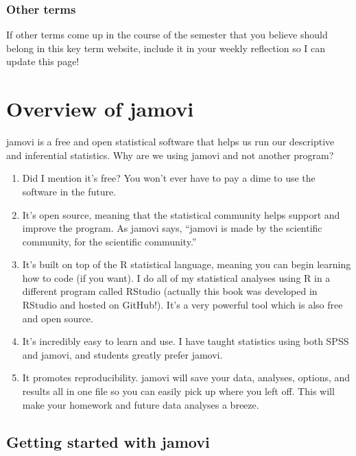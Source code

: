 \documentclass[
]{book}
\begin{document}
\hypertarget{other-terms}{%
\subsection{Other terms}\label{other-terms}}

If other terms come up in the course of the semester that you believe should belong in this key term website, include it in your weekly reflection so I can update this page!

\hypertarget{overview-of-jamovi}{%
\chapter{Overview of jamovi}\label{overview-of-jamovi}}

jamovi is a free and open statistical software that helps us run our descriptive and inferential statistics. Why are we using jamovi and not another program?

\begin{enumerate}
\def\labelenumi{\arabic{enumi}.}
\item
  Did I mention it's free? You won't ever have to pay a dime to use the software in the future.
\item
  It's open source, meaning that the statistical community helps support and improve the program. As jamovi says, ``jamovi is made by the scientific community, for the scientific community.''
\item
  It's built on top of the R statistical language, meaning you can begin learning how to code (if you want). I do all of my statistical analyses using R in a different program called RStudio (actually this book was developed in RStudio and hosted on GitHub!). It's a very powerful tool which is also free and open source.
\item
  It's incredibly easy to learn and use. I have taught statistics using both SPSS and jamovi, and students greatly prefer jamovi.
\item
  It promotes reproducibility. jamovi will save your data, analyses, options, and results all in one file so you can easily pick up where you left off. This will make your homework and future data analyses a breeze.
\end{enumerate}

\hypertarget{getting-started-with-jamovi}{%
\section{Getting started with jamovi}\label{getting-started-with-jamovi}}
\end{document}
